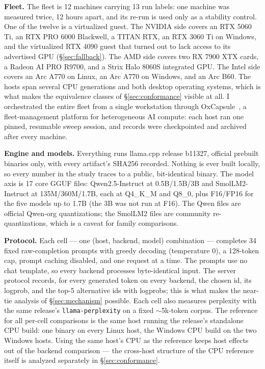 \documentclass[11pt]{article}
\begin{document}
\textbf{Fleet.} The fleet is 12 machines carrying 13 run labels: one
machine was measured twice, 12 hours apart, and its re-run is used
only as a stability control. One of the twelve is a virtualized
guest. The NVIDIA side covers an RTX 5060 Ti, an RTX PRO 6000
Blackwell, a TITAN RTX, an RTX 3060 Ti on Windows, and the virtualized
RTX 4090 guest that turned out to lack access to its advertised GPU
(\S\ref{sec:fallback}). The AMD side covers two RX 7900 XTX cards, a
Radeon AI PRO R9700, and a Strix Halo 8060S integrated GPU. The Intel
side covers an Arc A770 on Linux, an Arc A770 on Windows, and an Arc
B60. The hosts span several CPU generations and both desktop operating
systems, which is what makes the equivalence classes of
\S\ref{sec:conformance} visible at all. I orchestrated the entire
fleet from a single workstation through OxCapsule~\cite{oxcapsule}, a
fleet-management platform for heterogeneous AI compute: each host ran
one pinned, resumable sweep session, and records were checkpointed and
archived after every machine.

\textbf{Engine and models.} Everything runs llama.cpp release b11327,
official prebuilt binaries only, with every artifact's SHA256
recorded. Nothing is ever built locally, so every number in the study
traces to a public, bit-identical binary. The model axis is 17 core
GGUF files: Qwen2.5-Instruct at 0.5B/1.5B/3B and SmolLM2-Instruct at
135M/360M/1.7B, each at Q4\_K\_M and Q8\_0, plus F16/FP16 for the five
models up to 1.7B (the 3B was not run at F16). The Qwen files are
official Qwen-org quantizations; the SmolLM2 files are community
re-quantizations, which is a caveat for family comparisons.

\textbf{Protocol.} Each cell --- one (host, backend, model)
combination --- completes 34 fixed raw-completion prompts with greedy
decoding (temperature 0), a 128-token cap, prompt caching disabled,
and one request at a time. The prompts use no chat template, so every
backend processes byte-identical input. The server protocol records,
for every generated token on every backend, the chosen id, its
logprob, and the top-5 alternative ids with logprobs; this is what
makes the near-tie analysis of \S\ref{sec:mechanism} possible. Each
cell also measures perplexity with the same release's
\texttt{llama-perplexity} on a fixed $\sim$5k-token corpus. The
reference for all per-cell comparisons is the same host running the
release's standalone CPU build: one binary on every Linux host, the
Windows CPU build on the two Windows hosts. Using the same host's CPU
as the reference keeps host effects out of the backend comparison ---
the cross-host structure of the CPU reference itself is analyzed
separately in \S\ref{sec:conformance}.
\end{document}
